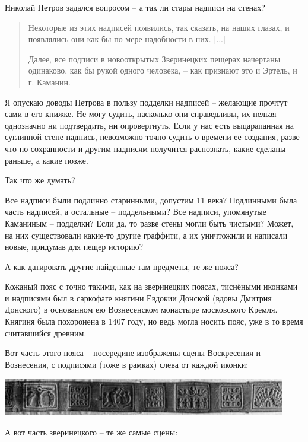 Николай Петров задался вопросом – а так ли стары надписи на стенах?

\begin{quotation}
Некоторые из этих надписей появились, так сказать, на наших глазах, и появлялись они как бы по мере надобности в них. [...]

Далее, все подписи в новооткрытых Зверинецких пещерах начертаны одинаково, как бы рукой одного человека, – как признают это и Эртель, и г. Каманин.
\end{quotation}

Я опускаю доводы Петрова в пользу подделки надписей – желающие прочтут сами в его книжке. Не могу судить, насколько они справедливы, их нельзя однозначно ни подтвердить, ни опровергнуть. Если у нас есть выцарапанная на суглинной стене надпись, невозможно точно судить о времени ее создания, разве что по сохранности и другим надписям получится распознать, какие сделаны раньше, а какие позже.

Так что же думать? 

Все надписи были подлинно старинными, допустим 11 века? Подлинными была часть надписей, а остальные – поддельными? Все надписи, упомянутые Каманиным – подделки? Если да, то разве стены могли быть чистыми? Может, на них существовали какие-то другие граффити, а их уничтожили и написали новые, придумав для пещер историю?

А как датировать другие найденные там предметы, те же пояса?

Кожаный пояс с точно такими, как на зверинецких поясах, тиснёными иконками и надписями был в саркофаге княгини Евдокии Донской (вдовы Дмитрия Донского) в основанном ею Вознесенском монастыре московского Кремля. Княгиня была похоронена в 1407 году, но ведь могла носить пояс, уже в то время считавшийся древним.

Вот часть этого пояса – посередине изображены сцены Воскресения и Вознесения, с подписями (тоже в рамках) слева от каждой иконки:

\begin{center}
\includegraphics[width=\linewidth]{chast-colebanie-osnov/nachalo/tis02.jpg}
\end{center}

А вот часть зверинецкого – те же самые сцены:


